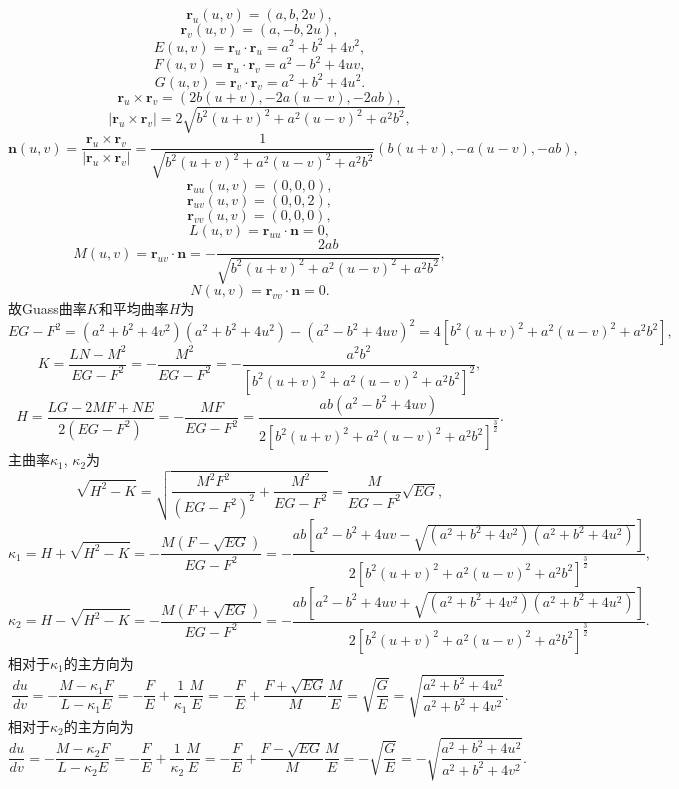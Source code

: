 \documentclass[11pt,a4paper]{article}
\begin{document}
$$\mathbf{r}_u(u,v)=(a,b,2v),$$
$$\mathbf{r}_v(u,v)=(a,-b,2u),$$
$$E(u,v)=\mathbf{r}_u\cdot \mathbf{r}_u=a^2+b^2+4v^2,$$
$$F(u,v)=\mathbf{r}_u\cdot \mathbf{r}_v=a^2-b^2+4uv,$$
$$G(u,v)=\mathbf{r}_v\cdot \mathbf{r}_v=a^2+b^2+4u^2.$$
$$\mathbf{r}_u\times\mathbf{r}_v=(2b(u+v),-2a(u-v),-2ab),$$
$$|\mathbf{r}_u\times\mathbf{r}_v|=2\sqrt{b^2(u+v)^2+a^2(u-v)^2+a^2b^2},$$
$$\mathbf{n}(u,v)=\frac{\mathbf{r}_u\times\mathbf{r}_v}{|\mathbf{r}_u\times\mathbf{r}_v|}=\frac{1}{\sqrt{b^2(u+v)^2+a^2(u-v)^2+a^2b^2}}(b(u+v),-a(u-v),-ab),$$
$$\mathbf{r}_{uu}(u,v)=(0,0,0),$$
$$\mathbf{r}_{uv}(u,v)=(0,0,2),$$
$$\mathbf{r}_{vv}(u,v)=(0,0,0),$$
$$L(u,v)=\mathbf{r}_{uu}\cdot\mathbf{n}=0,$$
$$M(u,v)=\mathbf{r}_{uv}\cdot\mathbf{n}=-\frac{2ab}{\sqrt{b^2(u+v)^2+a^2(u-v)^2+a^2b^2}},$$
$$N(u,v)=\mathbf{r}_{vv}\cdot\mathbf{n}=0.$$
故Guass曲率$K$和平均曲率$H$为
$$EG-F^2=(a^2+b^2+4v^2)(a^2+b^2+4u^2)-(a^2-b^2+4uv)^2=4[b^2(u+v)^2+a^2(u-v)^2+a^2b^2],$$
$$K=\frac{LN-M^2}{EG-F^2}=-\frac{M^2}{EG-F^2}=-\frac{a^2b^2}{[b^2(u+v)^2+a^2(u-v)^2+a^2b^2]^2},$$
$$H=\frac{LG-2MF+NE}{2(EG-F^2)}=-\frac{MF}{EG-F^2}=\frac{ab(a^2-b^2+4uv)}{2[b^2(u+v)^2+a^2(u-v)^2+a^2b^2]^{\frac{3}{2}}}.$$
主曲率$\kappa_1$, $\kappa_2$为
$$\sqrt{H^2-K}=\sqrt{\frac{M^2F^2}{(EG-F^2)^2}+\frac{M^2}{EG-F^2}}=\frac{M}{EG-F^2}\sqrt{EG},$$
$$\kappa_1=H+\sqrt{H^2-K}=-\frac{M(F-\sqrt{EG})}{EG-F^2}=-\frac{ab\left[a^2-b^2+4uv-\sqrt{(a^2+b^2+4v^2)(a^2+b^2+4u^2)}\right]}{2[b^2(u+v)^2+a^2(u-v)^2+a^2b^2]^{\frac{3}{2}}},$$
$$\kappa_2=H-\sqrt{H^2-K}=-\frac{M(F+\sqrt{EG})}{EG-F^2}=-\frac{ab\left[a^2-b^2+4uv+\sqrt{(a^2+b^2+4v^2)(a^2+b^2+4u^2)}\right]}{2[b^2(u+v)^2+a^2(u-v)^2+a^2b^2]^{\frac{3}{2}}}.$$
相对于$\kappa_1$的主方向为
$$\frac{du}{dv}=-\frac{M-\kappa_1 F}{L-\kappa_1 E}=-\frac{F}{E}+\frac{1}{\kappa_1}\frac{M}{E}=-\frac{F}{E}+\frac{F+\sqrt{EG}}{M}\frac{M}{E}=\sqrt{\frac{G}{E}}=\sqrt{\frac{a^2+b^2+4u^2}{a^2+b^2+4v^2}}.$$
相对于$\kappa_2$的主方向为
$$\frac{du}{dv}=-\frac{M-\kappa_2 F}{L-\kappa_2 E}=-\frac{F}{E}+\frac{1}{\kappa_2}\frac{M}{E}=-\frac{F}{E}+\frac{F-\sqrt{EG}}{M}\frac{M}{E}=-\sqrt{\frac{G}{E}}=-\sqrt{\frac{a^2+b^2+4u^2}{a^2+b^2+4v^2}}.$$
\end{document}
